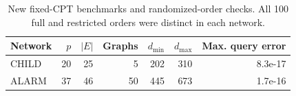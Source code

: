 \begin{table}[tbp]\centering
\caption{New fixed-CPT benchmarks and randomized-order checks. All 100 full and restricted orders were distinct in each network.}\label{tab:new-structure}
\begin{tabular}{lrrrrrr}
\toprule
Network & $p$ & $|E|$ & Graphs & $d_{\min}$ & $d_{\max}$ & Max. query error\\
\midrule
CHILD & 20 & 25 & 5 & 202 & 310 & 8.3e-17\\
ALARM & 37 & 46 & 50 & 445 & 673 & 1.7e-16\\
\bottomrule\end{tabular}\end{table}
